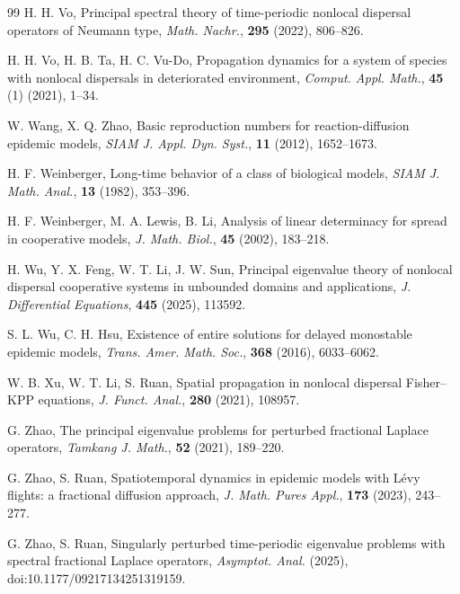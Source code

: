 \documentclass[a4paper,11pt]{amsart}
\theoremstyle{definition}
\numberwithin{equation}{section}
\theoremstyle{definition}
\begin{document}
\begin{thebibliography}{99}
H. H. Vo, 
Principal spectral theory of time-periodic nonlocal dispersal operators of Neumann type, 
\textit{Math. Nachr.}, \textbf{295} (2022), 806--826. 



H. H. Vo, H. B. Ta, H. C. Vu-Do, 
Propagation dynamics for a system of species with nonlocal dispersals in deteriorated environment, 
\textit{Comput. Appl. Math.}, \textbf{45} (1) (2021), 1--34.

W. Wang, X. Q. Zhao, 
Basic reproduction numbers for reaction-diffusion epidemic models, 
\textit{SIAM J. Appl. Dyn. Syst.}, \textbf{11} (2012), 1652--1673.

H. F. Weinberger,
Long-time behavior of a class of biological models,
\textit{SIAM J. Math. Anal.}, \textbf{13} (1982), 353--396.

H. F. Weinberger, M. A. Lewis, B. Li,
Analysis of linear determinacy for spread in cooperative models,
\textit{J. Math. Biol.}, \textbf{45} (2002), 183--218.

H. Wu, Y. X. Feng, W. T. Li, J. W. Sun, 
Principal eigenvalue theory of nonlocal dispersal cooperative systems in unbounded domains and applications, 
\textit{J. Differential Equations}, \textbf{445} (2025), 113592.

S. L. Wu, C. H. Hsu, 
Existence of entire solutions for delayed monostable epidemic models, 
\textit{Trans. Amer. Math. Soc.}, \textbf{368} (2016), 6033--6062.


W. B. Xu, W. T. Li, S. Ruan, 
Spatial propagation in nonlocal dispersal Fisher--KPP equations, 
\textit{J. Funct. Anal.}, \textbf{280} (2021), 108957.


G. Zhao,
The principal eigenvalue problems for perturbed fractional Laplace operators,
\textit{Tamkang J. Math.}, \textbf{52} (2021), 189--220.


G. Zhao, S. Ruan, 
Spatiotemporal dynamics in epidemic models with Lévy flights: a fractional diffusion approach, 
\textit{J. Math. Pures Appl.}, \textbf{173} (2023), 243--277.

G. Zhao, S. Ruan, 
Singularly perturbed time-periodic eigenvalue problems with spectral fractional Laplace operators, 
\textit{Asymptot. Anal.} (2025), doi:10.1177/09217134251319159.

\end{thebibliography}
\end{document}
